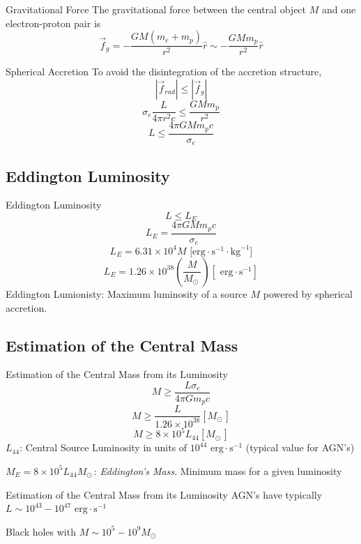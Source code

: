 \documentclass{beamer}
\begin{document}
\begin{frame}{Gravitational Force}
	The gravitational force between the central object $M$ and one electron-proton pair is
	\pause
	\[\vec{f}_g = -\frac{GM(m_e + m_p)}{r^2} \hat{r} \sim -\frac{GM m_p}{r^2} \hat{r}\]
\end{frame}

\begin{frame}{Spherical Accretion}
	To avoid the disintegration of the accretion structure,
	\pause
	\[|\vec{f}_{rad}| \leq | \vec{f}_g|\]
	\pause
	\[ \sigma_e \frac{L}{4\pi r^2 c} \leq \frac{GM m_p}{r^2} \]
	\pause
	\[ L \leq \frac{4 \pi GM m_p c}{\sigma_e} \]
\end{frame}

\subsection{Eddington Luminosity}
\begin{frame}{Eddington Luminosity}
	\[ L \leq L_E \]
	\pause
	\[ L_E = \frac{4 \pi GM m_p c}{\sigma_e} \]
	\pause
	\[ L_E = 6.31 \times 10^4 M \textrm{ [erg} \cdot \textrm{s}^{-1} \cdot \textrm{kg}^{-1} \textrm{]}  \]
	\pause
	\[ L_E = 1.26 \times 10^{38} \left(\frac{M}{M_\odot\ } \right) \left[ \textrm{ erg} \cdot \textrm{s}^{-1} \right] \]
	\pause
	\footnotesize
	Eddington Lumionisty: Maximum luminosity of a source $M$ powered by spherical accretion.
\end{frame}

\subsection{Estimation of the Central Mass}
\begin{frame}{Estimation of the Central Mass from its Luminosity}
	\[ M \geq \frac{L \sigma_e}{4 \pi G m_p c} \]
	\pause
	\[ M \geq \frac{L}{1.26 \times 10^{38}} \left[ M_{\odot\ } \right] \]
	\pause
	\[ M \geq 8 \times 10^5 L_{44} \left[ M_{\odot\ } \right] \]
	\pause
	\footnotesize
	$L_{44}$: Central Source Luminosity in units of $10^{44} \textrm{ erg} \cdot \textrm{s}^{-1}$ (typical value for AGN's)\\
	\pause
	
	$M_E = 8 \times 10^5 L_{44} M_{\odot\ }$: \textit{Eddington's Mass}. Minimum mass for a given luminosity
\end{frame}

\begin{frame}{Estimation of the Central Mass from its Luminosity}
	AGN's have typically $L \sim 10^{43} - 10^{47} \textrm{ erg} \cdot \textrm{s}^{-1}$\\	
	\pause
	
	Black holes with $ M \sim 10^5 - 10^9 M_{\odot\ }$
\end{frame}
\end{document}
